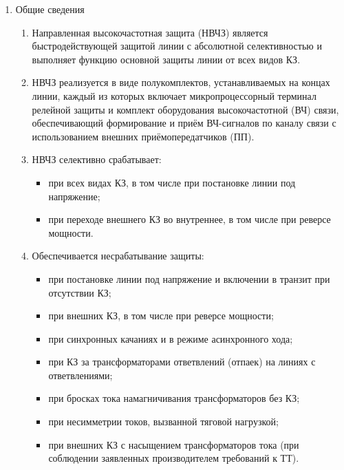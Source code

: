 \color{black}

\begin{enumerate}[label=\arabic{section}.\arabic{subsection}.\arabic{enumi}, labelsep=4pt, leftmargin=0pt, itemindent=57pt, itemsep=0pt, parsep=5pt] %

\item Общие сведения

\begin{enumerate}[label=\arabic{section}.\arabic{subsection}.\arabic{enumi}.\arabic*, labelsep=4pt, leftmargin=0em, itemindent=65pt, parsep=0pt]

\item
Направленная высокочастотная защита (НВЧЗ) является быстродействующей защитой линии с абсолютной селективностью и выполняет функцию основной защиты линии от всех видов КЗ. 

\item
НВЧЗ реализуется в виде полукомплектов, устанавливаемых на концах линии, каждый из которых включает микропроцессорный терминал релейной защиты и комплект оборудования высокочастотной (ВЧ) связи, обеспечивающий формирование и приём ВЧ-сигналов по каналу связи с использованием внешних приёмопередатчиков (ПП).

\item 
НВЧЗ селективно срабатывает:
\begin{itemize}
    \item при всех видах КЗ, в том числе при постановке линии под напряжение; 
    \item при переходе внешнего КЗ во внутреннее, в том числе при реверсе мощности.
\end{itemize}

\item 
Обеспечивается несрабатывание защиты:
\begin{itemize} 
\item при постановке линии под напряжение и включении в транзит при отсутствии КЗ;
\item при внешних КЗ, в том числе при реверсе мощности;
\item при синхронных качаниях и в режиме асинхронного хода;
\item при КЗ за трансформаторами ответвлений (отпаек) на линиях с ответвлениями;
\item при бросках тока намагничивания трансформаторов без КЗ;
\item при несимметрии токов, вызванной тяговой нагрузкой;
\item при внешних КЗ с насыщением трансформаторов тока (при соблюдении заявленных производителем требований к ТТ).
\end{itemize}


\end{enumerate}
\end{enumerate}
